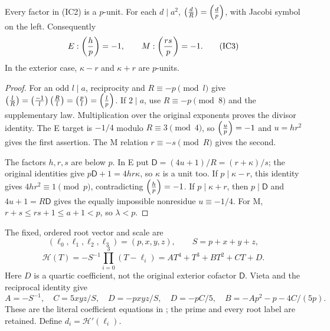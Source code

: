\begin{lemma}\label{lem:original}
Every factor in (IC2) is a $p$-unit. For each $d\mid a^2$,
$\left(\frac{d}{R}\right)=\left(\frac{d}{p}\right)$, with Jacobi symbol on the left. Consequently
\[
 E:\left(\frac{h}{p}\right)=-1,\qquad M:\left(\frac{rs}{p}\right)=-1.                      \tag{IC3}
\]
In the exterior case, $\kappa-r$ and $\kappa+r$ are $p$-units.
\end{lemma}
\begin{proof}
For an odd $l\mid a$, reciprocity and $R\equiv-p\pmod l$ give
$\left(\frac{l}{R}\right)=\left(\frac{-1}{l}\right)\left(\frac{R}{l}\right)=\left(\frac{p}{l}\right)=\left(\frac{l}{p}\right)$. If $2\mid a$, use
$R\equiv-p\pmod8$ and the supplementary law. Multiplication over the original
exponents proves the divisor identity. The E target is $-1/4$ modulo
$R\equiv3\pmod4$, so $\left(\frac{u}{p}\right)=-1$ and $u=hr^2$ gives the first assertion.
The M relation $r\equiv-s\pmod R$ gives the second.

The factors $h,r,s$ are below $p$. In E put
$\mathsf D=(4u+1)/R=(r+\kappa)/s$; the original identities give
$p\mathsf D+1=4hr\kappa$, so $\kappa$ is a unit too.
If $p\mid\kappa-r$, this identity gives $4hr^2\equiv1\pmod p$, contradicting
$\left(\frac{h}{p}\right)=-1$. If $p\mid\kappa+r$, then $p\mid\mathsf D$ and
$4u+1=R\mathsf D$ gives the equally impossible nonresidue $u\equiv-1/4$.
For M, $r+s\le rs+1\le a+1<p$, so $\lambda<p$.
\end{proof}

The fixed, ordered root vector and scale are
\[
 (\ell_0,\ell_1,\ell_2,\ell_3)=(p,x,y,z),\qquad S=p+x+y+z,
\]
\[
 \mathcal H(T)=-S^{-1}\prod_{i=0}^3(T-\ell_i)
 =AT^4+T^3+BT^2+CT+D.                                   \tag{IC4}
\]
Here $D$ is a quartic coefficient, not the original exterior cofactor $\mathsf D$.
Vieta and the reciprocal identity give
\[
 A=-S^{-1},\quad C=5xyz/S,\quad D=-pxyz/S,
 \quad D=-pC/5,\quad B=-Ap^2-p-4C/(5p).                 \tag{IC5}
\]
These are the literal coefficient equations in \cite[\S2.1]{Input}; the prime
and every root label are retained. Define $d_i=\mathcal H'(\ell_i)$.

